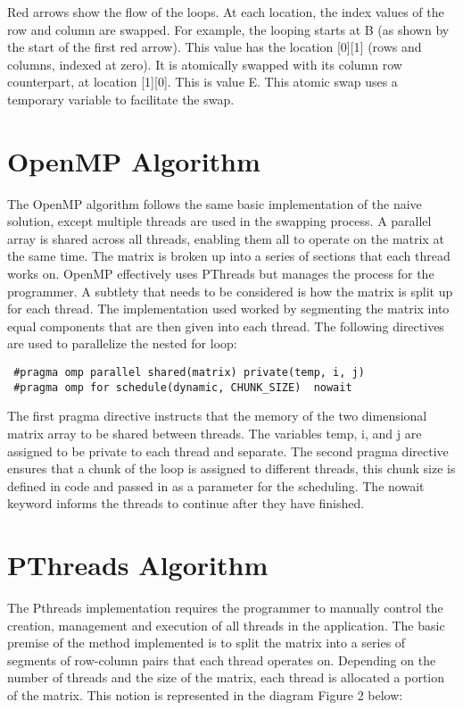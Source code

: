 \documentclass[10pt,onecolumn]{article}
\begin{document}
\noindent Red arrows show the flow of the loops. At each location, the index values of the row and column are swapped. For example, the looping starts at B (as shown by the start of the first red arrow). This value has the location [0][1] (rows and columns, indexed at zero). It is atomically swapped with its column row counterpart, at location [1][0]. This is value E. This atomic swap uses a temporary variable to facilitate the swap.

\section{OpenMP Algorithm}
The OpenMP algorithm follows the same basic implementation of the naive solution, except multiple threads are used in the swapping process. A parallel array is shared across all threads, enabling them all to operate on the matrix at the same time. The matrix is broken up into a series of sections that each thread works on. OpenMP effectively uses PThreads but manages the process for the programmer. A subtlety that needs to be considered is how the matrix is split up for each thread. The implementation used worked by segmenting the matrix into equal components that are then given into each thread. The following directives are used to parallelize the nested for loop: 

\begin{verbatim}
 #pragma omp parallel shared(matrix) private(temp, i, j)
 #pragma omp for schedule(dynamic, CHUNK_SIZE)  nowait
\end{verbatim}

\noindent The first pragma directive instructs that the memory of the two dimensional matrix array to be shared between threads. The variables temp, i, and j are assigned to be private to each thread and separate. The second pragma directive ensures that a chunk of the loop is assigned to different threads, this chunk size is defined in code and passed in as a parameter for the scheduling. The nowait keyword informs the threads to continue after they have finished.

\section{PThreads Algorithm}
The Pthreads implementation requires the programmer to manually control the creation, management and execution of all threads in the application. The basic premise of the method implemented is to split the matrix into a series of segments of row-column pairs that each thread operates on. Depending on the number of threads and the size of the matrix, each thread is allocated a portion of the matrix.  This notion is represented in the diagram Figure 2 below: \\
\end{document}
